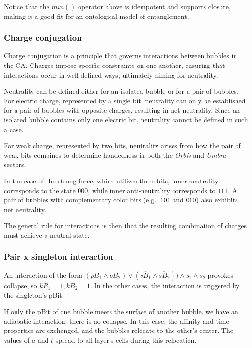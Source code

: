 \documentclass[12pt,english]{article}
\begin{document}
Notice that the $min()$ operator above is idempotent and supports closure, making it a good fit for an ontological model of entanglement.

\subsubsection{Charge conjugation}

Charge conjugation is a principle that governs interactions between bubbles in the CA. Charges impose specific constraints on one another, ensuring that interactions occur in well-defined ways, ultimately aiming for neutrality.

Neutrality can be defined either for an isolated bubble or for a pair of bubbles. For electric charge, represented by a single bit, neutrality can only be established for a pair of bubbles with opposite charges, resulting in net neutrality. Since an isolated bubble contains only one electric bit, neutrality cannot be defined in such a case.

For weak charge, represented by two bits, neutrality arises from how the pair of weak bits combines to determine handedness in both the \textit{Orbis} and \textit{Umbra} sectors.

In the case of the strong force, which utilizes three bits, inner neutrality corresponds to the state \(000\), while inner anti-neutrality corresponds to \(111\). A pair of bubbles with complementary color bits (e.g., \(101\) and \(010\)) also exhibits net neutrality.

The general rule for interactions is then that the resulting combination of charges must achieve a neutral state.

\subsubsection{Pair x singleton interaction}
An interaction of the form $(pB_1\wedge pB_2)\vee (\overline{sB_1}\wedge\overline{sB_2}))\wedge s_1\wedge s_2$ provokes collapse, so $kB_1=1,kB_2=1$. In the other cases, the interaction is triggered by the singleton's pBit.

If only the pBit of one bubble meets the surface of another bubble, we have an adiabatic interaction: there is no collapse. In this case, the affinity and time properties are exchanged, and the bubbles relocate to the other's center. The values of $a$ and $t$ spread to all layer's cells during this relocation.
\end{document}
